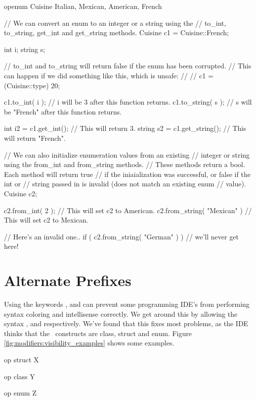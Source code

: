 \begin{opcpp}[label={fig:openum:string_conversion},caption={String and integer conversion routines for \opcppk{openum}.}]
openum Cuisine
{
    Italian,
    Mexican,
    American,
    French
}

// We can convert an enum to an integer or a string using the 
// to_int, to_string, get_int and get_string methods.
Cuisine c1 = Cuisine::French;

int    i;
string s;

// to_int and to_string will return false if the enum has been corrupted.
// This can happen if we did something like this, which is unsafe:
// 
// c1 = (Cuisine::type) 20;

c1.to_int( i );    // i will be 3 after this function returns.
c1.to_string( s ); // s will be "French" after this function returns.

int    i2 = c1.get_int();    // This will return 3.
string s2 = c1.get_string(); // This will return "French".

// We can also initialize enumeration values from an existing
// integer or string using the from_int and from_string methods.
// These methods return a bool.  Each method will return true
// if the iniaialization was successful, or false if the int or
// string passed in is invalid (does not match an existing enum
// value).
Cuisine c2;

c2.from_int( 2 );           // This will set c2 to American.
c2.from_string( "Mexican" ) // This will set c2 to Mexican.

// Here's an invalid one..
if ( c2.from_string( "German" ) )
    // we'll never get here!
\end{opcpp}

\section{Alternate Prefixes}
\label{sec:categories:alternate_prefixes}

Using the keywords ,  and  can prevent some programming IDE's from performing syntax coloring and intellisense correctly.  We get around this by allowing the syntax ,  and  respectively.  We've found that this fixes most problems, as the IDE thinks that the \opCPP\ constructs are class, struct and enum.  Figure \ref{fig:modifiers:visibility_examples} shows some examples.

\begin{opcpp}[label={fig:modifiers:visibility_examples},caption={Alternate prefixes.}]
op struct X
{

}

op class Y
{

}

op enum Z
{

}
\end{opcpp}

